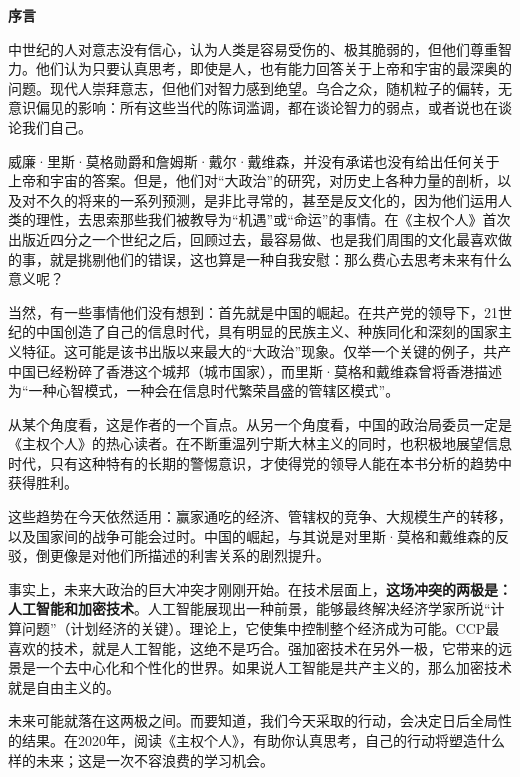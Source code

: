 \begin{center}
    \Huge\textbf{序言}
\end{center}

中世纪的人对意志没有信心，认为人类是容易受伤的、极其脆弱的，但他们尊重智力。他们认为只要认真思考，即使是人，也有能力回答关于上帝和宇宙的最深奥的问题。现代人崇拜意志，但他们对智力感到绝望。乌合之众，随机粒子的偏转，无意识偏见的影响：所有这些当代的陈词滥调，都在谈论智力的弱点，或者说也在谈论我们自己。

威廉·里斯·莫格勋爵和詹姆斯·戴尔·戴维森，并没有承诺也没有给出任何关于上帝和宇宙的答案。但是，他们对“大政治”的研究，对历史上各种力量的剖析，以及对不久的将来的一系列预测，是非比寻常的，甚至是反文化的，因为他们运用人类的理性，去思索那些我们被教导为“机遇”或“命运”的事情。在《主权个人》首次出版近四分之一个世纪之后，回顾过去，最容易做、也是我们周围的文化最喜欢做的事，就是挑剔他们的错误，这也算是一种自我安慰：那么费心去思考未来有什么意义呢？

当然，有一些事情他们没有想到：首先就是中国的崛起。在共产党的领导下，21世纪的中国创造了自己的信息时代，具有明显的民族主义、种族同化和深刻的国家主义特征。这可能是该书出版以来最大的“大政治”现象。仅举一个关键的例子，共产中国已经粉碎了香港这个城邦（城市国家），而里斯·莫格和戴维森曾将香港描述为“一种心智模式，一种会在信息时代繁荣昌盛的管辖区模式”。

从某个角度看，这是作者的一个盲点。从另一个角度看，中国的政治局委员一定是《主权个人》的热心读者。在不断重温列宁斯大林主义的同时，也积极地展望信息时代，只有这种特有的长期的警惕意识，才使得党的领导人能在本书分析的趋势中获得胜利。

这些趋势在今天依然适用：赢家通吃的经济、管辖权的竞争、大规模生产的转移，以及国家间的战争可能会过时。中国的崛起，与其说是对里斯·莫格和戴维森的反驳，倒更像是对他们所描述的利害关系的剧烈提升。

事实上，未来大政治的巨大冲突才刚刚开始。在技术层面上，\textbf{这场冲突的两极是：人工智能和加密技术}。人工智能展现出一种前景，能够最终解决经济学家所说“计算问题”（计划经济的关键）。理论上，它使集中控制整个经济成为可能。CCP最喜欢的技术，就是人工智能，这绝不是巧合。强加密技术在另外一极，它带来的远景是一个去中心化和个性化的世界。如果说人工智能是共产主义的，那么加密技术就是自由主义的。

未来可能就落在这两极之间。而要知道，我们今天采取的行动，会决定日后全局性的结果。在2020年，阅读《主权个人》，有助你认真思考，自己的行动将塑造什么样的未来；这是一次不容浪费的学习机会。

